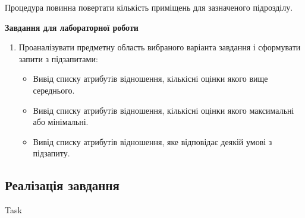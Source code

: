 \documentclass[a4paper,12pt]{article}
\newcommand{\RomanNumeralCaps}[1]{\MakeUppercase{\romannumeral #1}}
\begin{document}
	Процедура повинна повертати кількість приміщень для зазначеного підрозділу. \\
	\begin{center}
		\textbf{Завдання для лабораторної роботи}
	\end{center}
    \begin{enumerate}
        \item Проаналізувати предметну область вибраного варіанта завдання і сформувати 
        запити з підзапитами:
        \begin{itemize}
            \item Вивід списку атрибутів відношення, кількісні оцінки якого вище середнього.
            \item Вивід списку атрибутів відношення, кількісні оцінки якого максимальні або
            мінімальні.
            \item Вивід списку атрибутів відношення, яке відповідає деякій умові з підзапиту.
        \end{itemize}        
    \end{enumerate}


\newpage
	\begin{center}
		\section*{\bfseries{Реалізація завдання}}
	\end{center}
    \begin{center}
        \Large{Task \RomanNumeralCaps{1}}
    \end{center}
\end{document}
